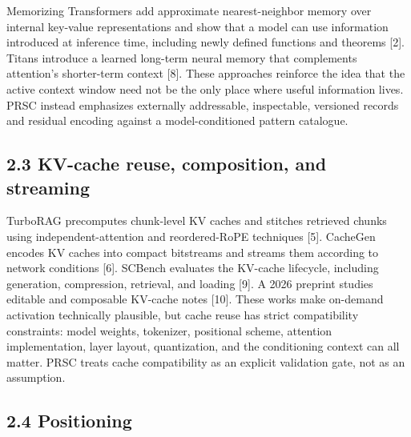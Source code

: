 \documentclass[
  10pt,
]{article}
\begin{document}
Memorizing Transformers add approximate nearest-neighbor memory over
internal key-value representations and show that a model can use
information introduced at inference time, including newly defined
functions and theorems {[}2{]}. Titans introduce a learned long-term
neural memory that complements attention's shorter-term context {[}8{]}.
These approaches reinforce the idea that the active context window need
not be the only place where useful information lives. PRSC instead
emphasizes externally addressable, inspectable, versioned records and
residual encoding against a model-conditioned pattern catalogue.

\subsection{2.3 KV-cache reuse, composition, and
streaming}\label{kv-cache-reuse-composition-and-streaming}

TurboRAG precomputes chunk-level KV caches and stitches retrieved chunks
using independent-attention and reordered-RoPE techniques {[}5{]}.
CacheGen encodes KV caches into compact bitstreams and streams them
according to network conditions {[}6{]}. SCBench evaluates the KV-cache
lifecycle, including generation, compression, retrieval, and loading
{[}9{]}. A 2026 preprint studies editable and composable KV-cache notes
{[}10{]}. These works make on-demand activation technically plausible,
but cache reuse has strict compatibility constraints: model weights,
tokenizer, positional scheme, attention implementation, layer layout,
quantization, and the conditioning context can all matter. PRSC treats
cache compatibility as an explicit validation gate, not as an
assumption.

\subsection{2.4 Positioning}\label{positioning}
\end{document}
